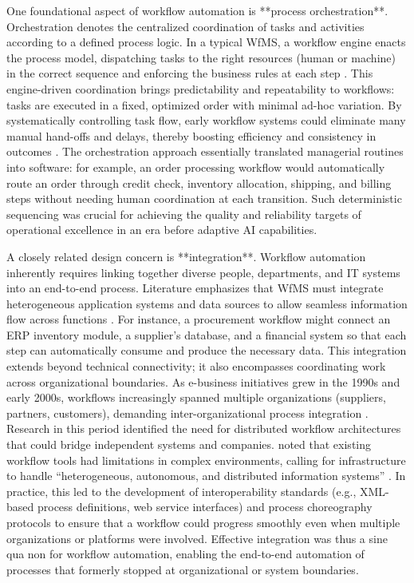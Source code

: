 One foundational aspect of workflow automation is **process orchestration**. Orchestration denotes the centralized coordination of tasks and activities according to a defined process logic. In a typical WfMS, a workflow engine enacts the process model, dispatching tasks to the right resources (human or machine) in the correct sequence and enforcing the business rules at each step \citep{basuResearch2002}. This engine-driven coordination brings predictability and repeatability to workflows: tasks are executed in a fixed, optimized order with minimal ad-hoc variation. By systematically controlling task flow, early workflow systems could eliminate many manual hand-offs and delays, thereby boosting efficiency and consistency in outcomes \citep{stohrWorkflow2001}. The orchestration approach essentially translated managerial routines into software: for example, an order processing workflow would automatically route an order through credit check, inventory allocation, shipping, and billing steps without needing human coordination at each transition. Such deterministic sequencing was crucial for achieving the quality and reliability targets of operational excellence in an era before adaptive AI capabilities.

A closely related design concern is **integration**. Workflow automation inherently requires linking together diverse people, departments, and IT systems into an end-to-end process. Literature emphasizes that WfMS must integrate heterogeneous application systems and data sources to allow seamless information flow across functions \citep{stohrWorkflow2001}. For instance, a procurement workflow might connect an ERP inventory module, a supplier’s database, and a financial system so that each step can automatically consume and produce the necessary data. This integration extends beyond technical connectivity; it also encompasses coordinating work across organizational boundaries. As e-business initiatives grew in the 1990s and early 2000s, workflows increasingly spanned multiple organizations (suppliers, partners, customers), demanding inter-organizational process integration \citep{basuResearch2002}. Research in this period identified the need for distributed workflow architectures that could bridge independent systems and companies. \textcite{georgakopoulosOverview1995} noted that existing workflow tools had limitations in complex environments, calling for infrastructure to handle “heterogeneous, autonomous, and distributed information systems” \citep{georgakopoulosOverview1995}. In practice, this led to the development of interoperability standards (e.g., XML-based process definitions, web service interfaces) and process choreography protocols to ensure that a workflow could progress smoothly even when multiple organizations or platforms were involved. Effective integration was thus a sine qua non for workflow automation, enabling the end-to-end automation of processes that formerly stopped at organizational or system boundaries.

